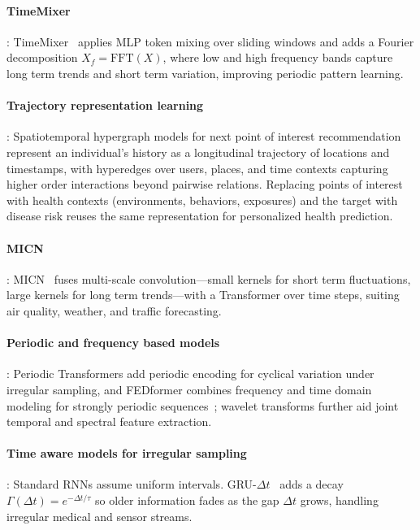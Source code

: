 \documentclass[journal]{IEEEtran}
\begin{document}
\paragraph{TimeMixer}: TimeMixer~\cite{timemixer} applies MLP token mixing over sliding windows and adds a Fourier decomposition $X_f=\mathrm{FFT}(X)$, where low and high frequency bands capture long term trends and short term variation, improving periodic pattern learning.

\paragraph{Trajectory representation learning}: Spatiotemporal hypergraph models for next point of interest recommendation~\cite{Zhang2023POI} represent an individual's history as a longitudinal trajectory of locations and timestamps, with hyperedges over users, places, and time contexts capturing higher order interactions beyond pairwise relations. Replacing points of interest with health contexts (environments, behaviors, exposures) and the target with disease risk reuses the same representation for personalized health prediction.

\paragraph{MICN}: MICN~\cite{wang2023micn} fuses multi-scale convolution---small kernels for short term fluctuations, large kernels for long term trends---with a Transformer over time steps, suiting air quality, weather, and traffic forecasting.

\paragraph{Periodic and frequency based models}: Periodic Transformers add periodic encoding for cyclical variation under irregular sampling, and FEDformer combines frequency and time domain modeling for strongly periodic sequences~\cite{zhou2022fedformer}; wavelet transforms further aid joint temporal and spectral feature extraction.

\paragraph{Time aware models for irregular sampling}: Standard RNNs assume uniform intervals. GRU-$\Delta t$~\cite{metzger2023crop} adds a decay $\Gamma(\Delta t)=e^{-\Delta t/\tau}$ so older information fades as the gap $\Delta t$ grows, handling irregular medical and sensor streams.
\end{document}
